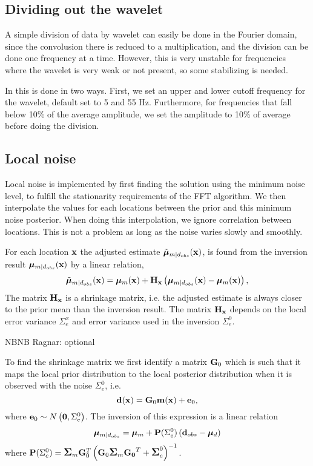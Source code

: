 \subsection{Dividing out the wavelet}
A simple division of data by wavelet can easily be done in the Fourier domain, since the convolusion there is reduced to a multiplication, and the division can be done one frequency at a time. However, this is very unstable for frequencies where the wavelet is very weak or not present, so some stabilizing is needed.

In \crava this is done in two ways. First, we set an upper and lower cutoff frequency for the wavelet, default set to 5 and 55 Hz. Furthermore, for frequencies that fall below 10\% of the average amplitude, we set the amplitude to 10\% of average before doing the division.

\subsection{Local noise}
\label{sec:localnoiseimp}
Local noise is implemented by first finding the solution using the minimum noise level, to fulfill the stationarity requirements of the FFT algorithm. We then interpolate the values for each locations between the prior and this minimum noise posterior. When doing this interpolation, we ignore correlation between locations. This is not a problem as long as the noise varies slowly and smoothly.


For each location $\mathbf{x}$ the adjusted estimate $\tilde{\bm\mu}_{m|d_{obs}}(\mathbf{x})$, is found 
from the inversion result $\bm\mu_{m|d_{obs}}(\mathbf{x})$ by a linear relation,
\begin{equation} \label{eq:LocalAdjustment}
\tilde{\bm\mu}_{m|d_{obs}}(\mathbf{x}) = \bm\mu_{m}(\mathbf{x}) +\mathbf{H_x}\left(\bm\mu_{m|d_{obs}}(\mathbf{x})-\bm\mu_{m}(\mathbf{x})\right),
\end{equation}
The matrix $\mathbf{H_x}$ is a shrinkage matrix, i.e. the adjusted estimate
is always closer to the prior mean than the inversion result. The matrix 
$\mathbf{H_x}$ depends on the local error variance
 $\Sigma_{e}^x$ and error variance used in the inversion $\Sigma_{e}^0$. 
 
NBNB Ragnar: optional 

To find the shrinkage matrix we first identify a matrix $\mathbf{G}_0$
which is such that it maps the local prior distribution to the local posterior distribution
when it is observed with the noise $\Sigma_{e}^0$, i.e.
$$ \mathbf{d}(\mathbf{x}) = \mathbf{G}_0\mathbf{m}(\mathbf{x})+\mathbf{e}_0,$$
where $\mathbf{e}_0\sim N\left( \mathbf{0},\Sigma_{e}^0\right)$.
The inversion of this expression is a linear relation
 \begin{equation} \label{eq:PSigmae}
\bm\mu_{m|d_{obs}} =\bm\mu_{m} +\mathbf{P}(\Sigma_{e}^0)\left(\mathbf{d}_{obs}-\bm\mu_{d}\right)
\end{equation}
where  $\mathbf{P}(\Sigma_{e}^0)=\mbox{\large\ensuremath{\boldsymbol{\Sigma}}}_{m}\mathbf{G}_0^T \left( \mathbf{G}_0\mbox{\large\ensuremath{\boldsymbol{\Sigma}}}_{m}\mathbf{G_0}^T+\mbox{\large\ensuremath{\boldsymbol{\Sigma}}}_{e}^0\right)^{-1}$.

